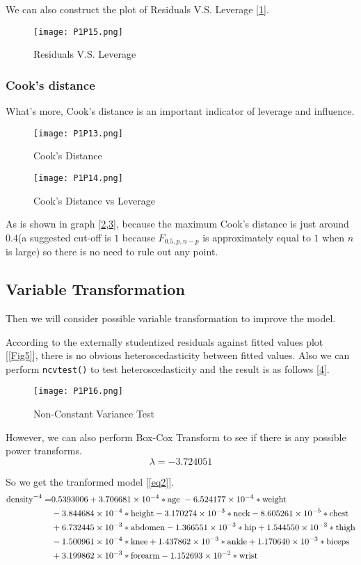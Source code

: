 \documentclass[11pt]{article}
\begin{document}
We can also construct the plot of Residuals V.S. Leverage [\ref{Fig10}].
\begin{figure}[!htb]
\centering
\texttt{[image: P1P15.png]}
\caption{Residuals V.S. Leverage}\label{Fig10}
\end{figure}

\subsubsection{Cook's distance}

What's more, Cook's distance is an important indicator of leverage and influence.
\begin{figure}[!htb]
\centering
\texttt{[image: P1P13.png]}
\caption{Cook's Distance}\label{Fig11}
\end{figure}

\begin{figure}[!htb]
\centering
\texttt{[image: P1P14.png]}
\caption{Cook's Distance vs Leverage}\label{Fig12}
\end{figure}
As is shown in graph [\ref{Fig11},\ref{Fig12}], because the maximum Cook's distance is just around $0.4$(a suggested cut-off is $1$ because $F_{0.5,p,n-p}$ is approximately equal to $1$ when $n$ is large) so there is no need to rule out any point.

\subsection{Variable Transformation}\label{ch4}

Then we will consider possible variable transformation to improve the model.

According to the externally studentized residuals against fitted values plot [\ref{Fig5}], there is no obvious heteroscedasticity between fitted values. Also we can perform \verb|ncvtest()| to test heteroscedasticity and the result is as follows [\ref{Fig13}].

\begin{figure}[!htb]
\centering
\texttt{[image: P1P16.png]}
\caption{Non-Constant Variance Test}\label{Fig13}
\end{figure}

However, we can also perform Box-Cox Transform to see if there is any possible power transforms.
$$\lambda=-3.724051$$

So we get the tranformed model [\ref{eq2}].
\begin{align}
	\text{density}^{-4} = &0.5393006+3.706681\times10^{-4} *\text{age }-6.524177\times10^{-4}*\text{weight}\notag\\
	&-3.844684\times10^{-4}*\text{height}-3.170274\times10^{-3}*\text{neck} -8.605261\times10^{-5}*\text{chest}\notag\\
	&+6.732445\times10^{-3}*\text{abdomen}-1.366551\times10^{-3}*\text{hip}+1.544550\times10^{-3}*\text{thigh}\notag \\ 
    &-1.500961\times10^{-4}*\text{knee} +1.437862\times10^{-3}*\text{ankle}+1.170640\times10^{-3}*\text{biceps}\notag\\
    & +3.199862\times10^{-3}*\text{forearm}-1.152693\times10^{-2}*\text{wrist}\label{eq2}   
\end{align}
\end{document}
